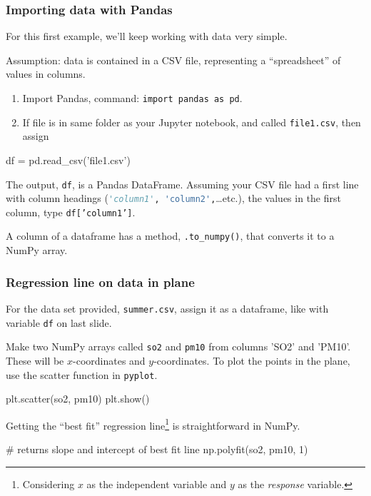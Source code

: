 \documentclass{beamer}
\newenvironment{codeblock}
    {\hfill\begin{beamerboxesrounded}[lower=codecol, width=0.8\textwidth]
    \medskip

    }
    { 
    \end{beamerboxesrounded}\hfill
    }
\theoremstyle{example}
\newcommand{\ct}[1]{\lstinline[language=Python]!#1!}
\newcommand{\ttt}[1]{{\small\texttt{#1}}}
\begin{document}
\begin{frame}[fragile]
    \frametitle{Importing data with Pandas}
For this first example, we'll keep working with data very simple. 

Assumption: data is contained in a CSV file, representing a ``spreadsheet'' of values in columns.

\pause
\begin{enumerate}
    \item Import Pandas, command: \ttt{import pandas as pd}.
    \item If file is in same folder as your Jupyter notebook, and called \ttt{file1.csv}, then assign 
\end{enumerate}

\pause
\begin{codeblock}

\begin{python}[numbers=none]
df = pd.read_csv('file1.csv')
\end{python}

\end{codeblock}

The output, \ttt{df}, is a Pandas DataFrame. Assuming your CSV file had a first line with column headings (\ct{'column1', 'column2',}\ldots etc.), the values in the first column, type \ttt{df['column1']}.

\pause
A column of a dataframe has a method, \ct{.to_numpy()}, that converts it to a NumPy array.
\end{frame}

\begin{frame}[fragile]
    \frametitle{Regression line on data in plane}
For the data set provided, \ttt{summer.csv}, assign it as a dataframe, like with variable \ct{df} on last slide. 

\pause
Make two NumPy arrays called \ttt{so2} and \ttt{pm10} from columns 'SO2' and 'PM10'. These will be $x$-coordinates and $y$-coordinates. To plot the points in the plane, use the scatter function in \ttt{pyplot}.

\pause
\begin{codeblock}

\begin{python}
plt.scatter(so2, pm10)
plt.show()
\end{python}

\end{codeblock}

\pause
Getting the ``best fit'' regression line\footnote{Considering $x$ as the independent variable and $y$ as the \emph{response} variable.} is straightforward in NumPy. 

\begin{codeblock}

\begin{python}
# returns slope and intercept of best fit line
np.polyfit(so2, pm10, 1)
\end{python}
    
\end{codeblock}
    
\end{frame}
\end{document}
